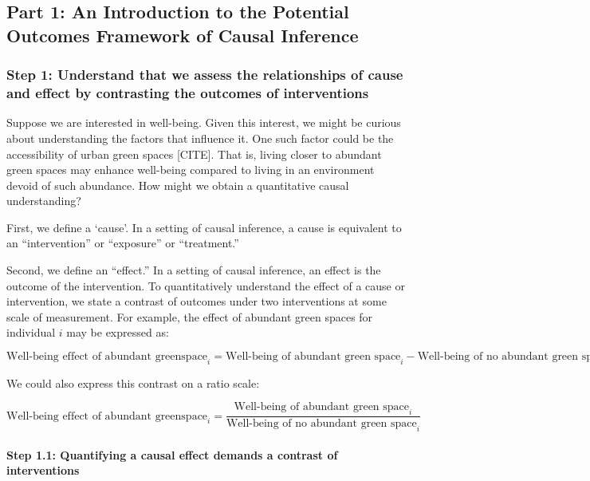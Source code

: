 \documentclass[
  singlecolumn]{article}
\let\oldparagraph\paragraph
\renewcommand{\paragraph}[1]{\oldparagraph{#1}\mbox{}}
\begin{document}
\hypertarget{part-1-an-introduction-to-the-potential-outcomes-framework-of-causal-inference}{%
\subsection{Part 1: An Introduction to the Potential Outcomes Framework
of Causal
Inference}\label{part-1-an-introduction-to-the-potential-outcomes-framework-of-causal-inference}}

\hypertarget{step-1-understand-that-we-assess-the-relationships-of-cause-and-effect-by-contrasting-the-outcomes-of-interventions}{%
\subsubsection{Step 1: Understand that we assess the relationships of
cause and effect by contrasting the outcomes of
interventions}\label{step-1-understand-that-we-assess-the-relationships-of-cause-and-effect-by-contrasting-the-outcomes-of-interventions}}

Suppose we are interested in well-being. Given this interest, we might
be curious about understanding the factors that influence it. One such
factor could be the accessibility of urban green spaces {[}CITE{]}. That
is, living closer to abundant green spaces may enhance well-being
compared to living in an environment devoid of such abundance. How might
we obtain a quantitative causal understanding?

First, we define a `cause'. In a setting of causal inference, a cause is
equivalent to an ``intervention'' or ``exposure'' or ``treatment.''

Second, we define an ``effect.'' In a setting of causal inference, an
effect is the outcome of the intervention. To quantitatively understand
the effect of a cause or intervention, we state a contrast of outcomes
under two interventions at some scale of measurement. For example, the
effect of abundant green spaces for individual \(i\) may be expressed
as:

\[
\text{Well-being effect of abundant greenspace}_{i} = \text{Well-being of abundant green space}_i - \text{Well-being of no abundant green space}_i
\]

We could also express this contrast on a ratio scale:

\[
\text{Well-being effect of abundant greenspace}_i = \frac{\text{Well-being of abundant green space}_i}{\text{Well-being of no abundant green space}_i}
\]

\hypertarget{step-1.1-quantifying-a-causal-effect-demands-a-contrast-of-interventions}{%
\paragraph{\texorpdfstring{\textbf{Step 1.1: Quantifying a causal effect
demands a contrast of
interventions}}{Step 1.1: Quantifying a causal effect demands a contrast of interventions}}\label{step-1.1-quantifying-a-causal-effect-demands-a-contrast-of-interventions}}
\end{document}
